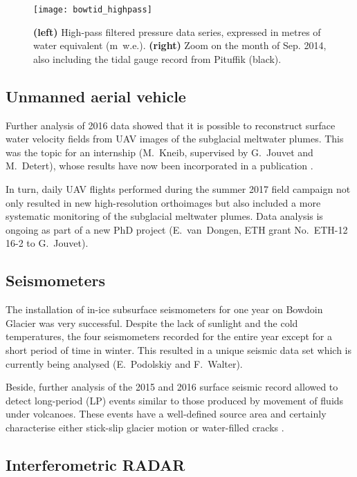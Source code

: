 \documentclass{article}
\begin{document}
    \begin{figure}
      \centerline{\texttt{[image: bowtid\_highpass]}}
      \caption{\textbf{(left)} High-pass filtered pressure data series,
               expressed in metres of water equivalent (m~w.e.).
               \textbf{(right)} Zoom on the month of Sep. 2014, also including
               the tidal gauge record from Pituffik (black).}
      \label{fig:highpass}
    \end{figure}


\subsection{Unmanned aerial vehicle}

    Further analysis of 2016 data showed that it is possible to reconstruct
    surface water velocity fields from UAV images of the subglacial meltwater
    plumes. This was the topic for an internship (M.~Kneib, supervised by
    G.~Jouvet and M.~Detert), whose results have now been incorporated in a
    publication \citep{Jouvet.etal.inreview}.

    In turn, daily UAV flights performed during the summer 2017 field campaign
    not only resulted in new high-resolution orthoimages but also included a
    more systematic monitoring of the subglacial meltwater plumes. Data
    analysis is ongoing as part of a new PhD project (E.~van~Dongen, ETH grant
    No.~ETH-12 16-2 to G.~Jouvet).


\subsection{Seismometers}

    The installation of in-ice subsurface seismometers for one year on Bowdoin
    Glacier was very successful. Despite the lack of sunlight and the cold
    temperatures, the four seismometers recorded for the entire year except for
    a short period of time in winter. This resulted in a unique seismic data
    set which is currently being analysed (E.~Podolskiy and F.~Walter).

    Beside, further analysis of the 2015 and 2016 surface seismic record
    allowed to detect long-period (LP) events similar to those produced by
    movement of fluids under volcanoes. These events have a well-defined source
    area and certainly characterise either stick-slip glacier motion or
    water-filled cracks \citep{Podolskiy.etal.Inprep}.


\subsection{Interferometric RADAR}
\end{document}
